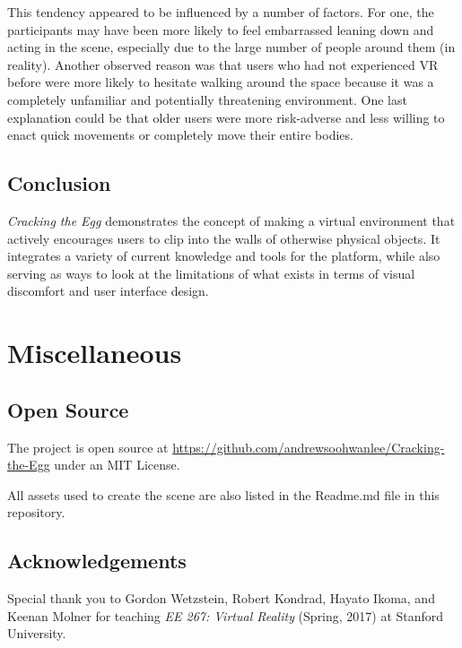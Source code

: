 \documentclass[10pt,twocolumn,letterpaper]{article}
\begin{document}
This tendency appeared to be influenced by a number of factors. For one, the participants may have been more likely to feel embarrassed leaning down and acting in the scene, especially due to the large number of people around them (in reality). Another observed reason was that users who had not experienced VR before were more likely to hesitate walking around the space because it was a completely unfamiliar and potentially threatening environment. One last explanation could be that older users were more risk-adverse and less willing to enact quick movements or completely move their entire bodies.

\subsection{Conclusion}

\textit{Cracking the Egg} demonstrates the concept of making a virtual environment that actively encourages users to clip into the walls of otherwise physical objects. It integrates a variety of current knowledge and tools for the platform, while also serving as ways to look at the limitations of what exists in terms of visual discomfort and user interface design.


\section{Miscellaneous}

\subsection{Open Source} \label{opensource}

The project is open source at \url{https://github.com/andrewsoohwanlee/Cracking-the-Egg} under an MIT License.

All assets used to create the scene are also listed in the Readme.md file in this repository.

\subsection{Acknowledgements}

Special thank you to Gordon Wetzstein, Robert Kondrad, Hayato Ikoma, and Keenan Molner for teaching \textit{EE 267: Virtual Reality} (Spring, 2017) at Stanford University.

{\small


}
\end{document}
